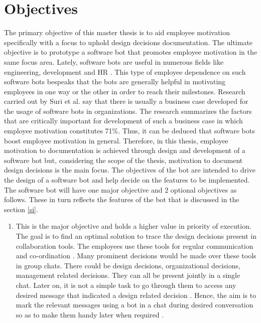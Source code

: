 \section{Objectives}
\label{obj}
The primary objective of this master thesis is to aid employee motivation specifically with a focus to uphold design decisions documentation. The ultimate objective is to prototype a software bot that promotes employee motivation in the same focus area. Lately, software bots are useful in numerous fields like engineering\cite{storey_botse_nodate}, development \cite{abdellatif_msrbot_2020} and HR \cite{mohan2019chat}. This type of employee dependence on such software bots bespeaks that the bots are generally helpful in motivating employees in one way or the other in order to reach their milestones. Research carried out by Suri et al. \cite{oshri_software_2017} say that there is usually a business case developed for the usage of software bots in organizations. The research summarizes the factors that are critically important for development of such a business case in which employee motivation constitutes 71\%. Thus, it can be deduced that software bots boost employee motivation in general. Therefore, in this thesis, employee motivation to documentation is achieved through design and development of a software bot but, considering the scope of the thesis, motivation to document design decisions is the main focus. The objectives of the bot are intended to drive the design of a software bot and help decide on the features to be implemented. The software bot will have one major objective and 2 optional objectives as follows. These in turn reflects the features of the bot that is discussed in the section \ref{si}. 
\begin{enumerate}
\item This is the major objective and holds a higher value in priority of execution. The goal is to find an optimal solution to trace the design decisions present in collaboration tools. The employees use these tools for regular communication and co-ordination \cite{lin_why_2016}. Many prominent decisions would be made over these tools in group chats. There could be design decisions, organizational decisions, management related decisions. They can all be present jointly in a single chat. Later on, it is not a simple task to go through them to access any desired message that indicated a design related decision \cite{zhang_making_2018}. Hence, the aim is to mark the relevant messages using a bot in a chat during desired conversation so as to make them handy later when required \cite{gilson2019natural}.
\end{enumerate}


